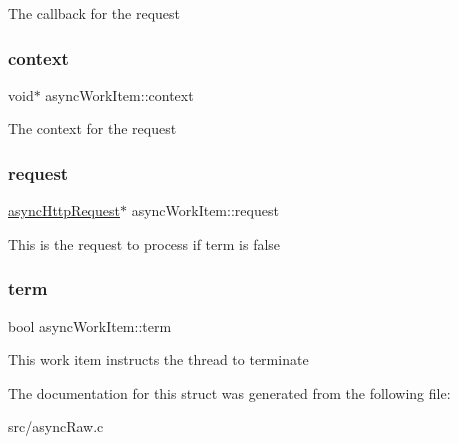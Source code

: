 The callback for the request \mbox{\label{structasyncWorkItem_a06379c9a4a8594373d5ffd9c0ab1af44}} 
\subsubsection{\texorpdfstring{context}{context}}
{\footnotesize\ttfamily void$\ast$ async\+Work\+Item\+::context}

The context for the request \mbox{\label{structasyncWorkItem_a80945057b42102b7ef5eb7a4b88f90ed}} 
\subsubsection{\texorpdfstring{request}{request}}
{\footnotesize\ttfamily \hyperlink{redfishRawAsync_8h_a18894e379815e825467bd6e13802b07b}{async\+Http\+Request}$\ast$ async\+Work\+Item\+::request}

This is the request to process if term is false \mbox{\label{structasyncWorkItem_a3acc23abec3617d1cbdd4b3a2f577612}} 
\subsubsection{\texorpdfstring{term}{term}}
{\footnotesize\ttfamily bool async\+Work\+Item\+::term}

This work item instructs the thread to terminate 

The documentation for this struct was generated from the following file\+:\begin{DoxyCompactItemize}
\item 
src/async\+Raw.\+c\end{DoxyCompactItemize}

